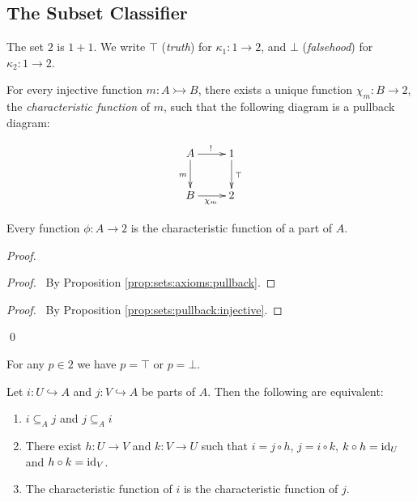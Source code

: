\subsection{The Subset Classifier}

\begin{df}
  The set $2$ is $1 + 1$. We write $\top$ (\emph{truth}) for $\kappa_1 : 1
  \rightarrow 2$, and $\bot$ (\emph{falsehood}) for $\kappa_2 : 1 \rightarrow
  2$.
\end{df}

\begin{ax}
  For every injective function $m : A \rightarrowtail B$, there exists a
  unique function $\chi_m : B \rightarrow 2$, the \emph{characteristic
    function} of $m$, such that the following diagram is a pullback diagram:

  \[
  \xymatrix{
    A \ar[d]_m \ar[r]^{!} & 1 \ar[d]^{\top} \\
    B \ar[r]_{\chi_m} & 2
  }
  \]
\end{ax}

\begin{prop}
 Every function $\phi : A \rightarrow 2$ is the characteristic function of a
 part of $A$.
\end{prop}

\begin{proof}
 \pf
 \begin{proof}
   \pf\ By Proposition \ref{prop:sets:axioms:pullback}.
 \end{proof}
 \begin{proof}
   \pf\ By Proposition \ref{prop:sets:pullback:injective}.
 \end{proof}
 \qed
\end{proof}

\begin{ax}[Boolean]
  For any $p \in 2$ we have $p = \top$ or $p = \bot$.
\end{ax}

 \begin{prop}
Let $i : U \hookrightarrow A$ and $j : V \hookrightarrow A$ be parts of $A$.
Then the following are equivalent:
\begin{enumerate}
\item $i \subseteq_A j$ and $j \subseteq_A i$
\item There exist $h : U \rightarrow V$ and $k : V \rightarrow U$ such that $i
= j \circ h$, $j = i \circ k$, $k \circ h = \mathrm{id}_{U}$ and $h \circ k = \mathrm{id}_{V}$.
\item The characteristic function of $i$ is the characteristic function of $j$.
\end{enumerate}
\end{prop}

